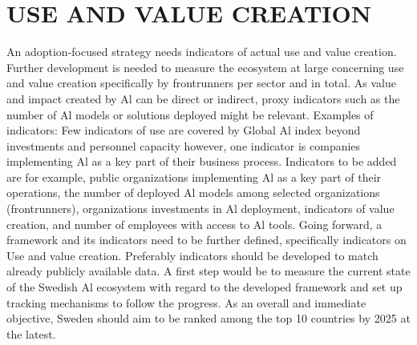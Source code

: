 \section*{USE AND VALUE CREATION}
An adoption-focused strategy needs indicators of actual use and value creation. Further development is needed to measure the ecosystem at large concerning use and value creation specifically by frontrunners per sector and in total. As value and impact created by Al can be direct or indirect, proxy indicators such as the number of Al models or solutions deployed might be relevant.
Examples of indicators:
Few indicators of use are covered by Global Al index beyond investments and personnel capacity however, one indicator is companies implementing Al as a key part of their business process.
Indicators to be added are for example, public organizations implementing Al as a key part of their operations, the number of deployed Al models among selected organizations (frontrunners), organizations investments in Al deployment, indicators of value creation, and number of employees with access to Al tools.
Going forward, a framework and its indicators need to be further defined, specifically indicators on Use and value creation. Preferably indicators should be developed to match already publicly available data. A first step would be to measure the current state of the Swedish Al ecosystem with regard to the developed framework and set up tracking mechanisms to follow the progress.
As an overall and immediate objective, Sweden should aim to be ranked among the top 10 countries by 2025 at the latest.

